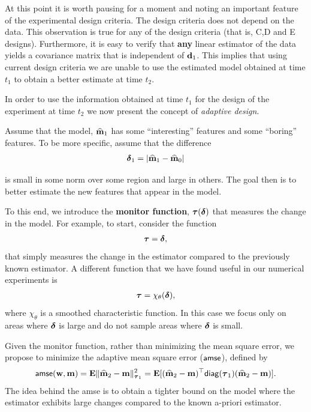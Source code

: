 \documentclass[11pt]{article}
\begin{document}
\bigskip

At this point it is worth  pausing for a moment and noting an important feature of the experimental design criteria. 
 The design criteria does not depend on the data. This observation is true for any of the 
 design criteria  (that is, C,D and E designs). 
 Furthermore, it is easy to verify that {\bf any} linear estimator of the data 
 yields a covariance matrix that is independent of ${\bf{d}}_{1}$.
 This implies that using current design criteria we are unable to
 use the estimated model obtained at time $t_{1}$  to obtain a better estimate at time $t_{2}$.

\bigskip


In order to use the information obtained at time $t_{1}$ for the design of the experiment at time $t_{2}$
 we now present the concept of {\em adaptive design}.

 Assume that the model, ${\widehat{{\bf{m}}}}_{1}$ has some ``interesting'' features and some ``boring'' features.
To be more specific, assume that the difference
\begin{align*}
 { \boldsymbol \delta}_{1} = |{\widehat{{\bf{m}}}}_{1} - {\widehat{{\bf{m}}}}_{0}|
\end{align*}


is small in some norm over some region and large in others. The goal then is to better estimate the new features
that appear in the model.

To this end, we introduce the {\bf monitor function}, ${\boldsymbol \tau}({ \boldsymbol \delta})$ that measures
the change in the model. 
For example, to start, consider the function
\begin{align}
\label{taufuns}
{\boldsymbol \tau} = { \boldsymbol \delta},
\end{align}
that simply measures the change in the estimator
compared to the previously known estimator. 
A different function that we have found useful in our numerical experiments is
\begin{align}
\label{taufunschi}
{\boldsymbol \tau} = \chi_{\theta}({ \boldsymbol \delta}),
\end{align}
where $\chi_{\theta}$ is a smoothed characteristic function. In this case we focus only on areas
where ${ \boldsymbol \delta}$ is large and do not sample areas where ${ \boldsymbol \delta}$ is small.


Given the monitor function,
rather than minimizing the mean square error, we propose to minimize the
adaptive mean square error (${\sf amse}$), defined by
\begin{align}
\label{amse}
{\sf amse}({\bf{w}},{\bf{m}}) = {\bf{E}}\| {\widehat{{\bf{m}}}}_2 -{\bf{m}} \|_{{\boldsymbol \tau}_1}^{2} = 
 {\bf{E}}[({\widehat{{\bf{m}}}}_2 -{\bf{m}})^{\top}{\sf diag}({\boldsymbol \tau}_1)({\widehat{{\bf{m}}}}_2 -{\bf{m}})].
 \end{align}
The idea behind the {\sf amse} is to obtain a tighter bound on the model where the estimator exhibits large changes
compared to the known a-priori estimator. 
\end{document}
